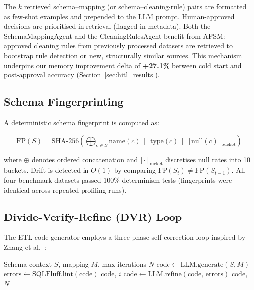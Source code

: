 \documentclass[9pt,a4paper,twocolumn,twoside]{rho-class/rho}
\begin{document}
        The $k$ retrieved schema--mapping (or schema--cleaning-rule) pairs are formatted as few-shot examples and prepended to the LLM prompt. Human-approved decisions are prioritised in retrieval (flagged in metadata). Both the SchemaMappingAgent and the CleaningRulesAgent benefit from AFSM: approved cleaning rules from previously processed datasets are retrieved to bootstrap rule detection on new, structurally similar sources. This mechanism underpins our memory improvement delta of \textbf{+27.1\%} between cold start and post-approval accuracy (Section~\ref{sec:hitl_results}).

    \subsection{Schema Fingerprinting}
    \label{sec:fingerprint}

        A deterministic schema fingerprint is computed as:

        \begin{equation}
            \mathrm{FP}(S) = \mathrm{SHA\text{-}256}\!\left(
                \bigoplus_{c \in S} \mathrm{name}(c)\,\|\,\mathrm{type}(c)\,\|\,\lfloor \mathrm{null}(c) \rfloor_{\text{bucket}}
            \right)
            \label{eq:fingerprint}
        \end{equation}

        where $\oplus$ denotes ordered concatenation and $\lfloor \cdot \rfloor_{\text{bucket}}$ discretises null rates into 10 buckets. Drift is detected in $O(1)$ by comparing $\mathrm{FP}(S_t) \neq \mathrm{FP}(S_{t-1})$. All four benchmark datasets passed 100\% determinism tests (fingerprints were identical across repeated profiling runs).

    \subsection{Divide-Verify-Refine (DVR) Loop}
    \label{sec:dvr}

        The ETL code generator employs a three-phase self-correction loop inspired by Zhang et al.\ \cite{zhang2024dvr}:

        \begin{algorithm}[H]
        \caption{Divide-Verify-Refine (DVR) Loop}
        \label{alg:dvr}
        \begin{algorithmic}[1]
        \REQUIRE Schema context $S$, mapping $M$, max iterations $N$
        \STATE $\mathrm{code} \leftarrow \mathrm{LLM.generate}(S, M)$
            \STATE $\mathrm{errors} \leftarrow \mathrm{SQLFluff.lint}(\mathrm{code})$
                \RETURN $\mathrm{code}$, $i$
            \ENDIF
            \STATE $\mathrm{code} \leftarrow \mathrm{LLM.refine}(\mathrm{code},\, \mathrm{errors})$
        \ENDFOR
        \RETURN $\mathrm{code}$, $N$
        \end{algorithmic}
        \end{algorithm}
\end{document}
